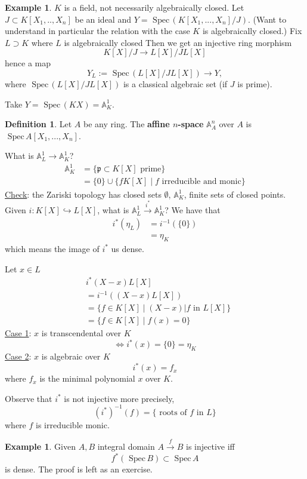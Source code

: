\documentclass[11pt]{article}
\theoremstyle{definition}
\newtheorem{dfn}[thm]{Definition}
\newtheorem{ex}[thm]{Example}
\newcommand{\spec}{\text{ Spec}\,}
\newcommand{\affn}{\mathbb A}
\newcommand{\scp}{{\mathfrak p}}
\newcommand{\lrta}{\longrightarrow}
\newcommand{\Llrta}{\Longleftrightarrow}
\newcommand{\inj}{\hookrightarrow}
\begin{document}
\begin{ex}
$K$ is a field, not necessarily algebraically closed. Let $J\subset K[X_1,..,X_n]$ be an ideal and $Y=\spec (K[X_1,...,X_n]/J)$. (Want to understand in particular the relation with the case $K$ is algebraically closed.) Fix $L \supset K$  where $L$  is algebraically closed Then we get an injective ring morphism 
$$
K[X]/J\lrta L[X]/JL[X]
$$
hence a map
$$
Y_L:=\spec(L[X]/JL[X])\lrta Y,
$$
where $\spec(L[X]/JL[X])$ is a classical algebraic set (if $J$ is prime).

Take
$Y=\spec (K{X})=\affn^1_K$.

\begin{dfn}
	Let $A$ be any ring. The \textbf{affine $n$-space} $\affn^n_A$ over $A$ is $\spec A[X_1,...,X_n]$.
\end{dfn}
	
	


What is $\affn^1_L\lrta \affn^1_K$?
$$
\begin{aligned}
\affn^1_K&=\{\scp\subset K[X]\text{ prime}\}\\
&=\{0\} \cup \{fK[X]\mid f \text{ irreducible and monic}\}
\end{aligned}
$$
\underline{Check}: the Zariski topology has  closed sets $\emptyset$, $\affn^1_K$, finite sets of closed points. Given $i: K[X]\inj L[X]$, what is 
$\affn^1_L\overset{i^*}{\lrta }\affn^1_K$? We have that
$$
\begin{aligned}
i^*(\eta_L)&=i^{-1}(\{0\})\\
&= \eta_K
\end{aligned}
$$
which means the image of $i^*$ us dense.

Let $x\in L$
$$\begin{aligned}
&i^*(X-x)L[X]\\
&=i^{-1}((X-x)L[X])\\
&=\{f\in K[X]\mid (X-x)|f\text{ in } L[X]\}\\
&=\{f\in K[X]\mid f(x)=0\}
\end{aligned}
$$
\underline{Case 1}: $x$ is transcendental over $K$ 
$$
\Llrta i^*(x)=\{0\}=\eta_K
$$
\underline{Case 2}: $x$ is algebraic over $K$
$$
i^*(x)=f_x
$$
 where $f_x$ is the minimal polynomial $x$ over $K$.

 Observe that $i^*$ is not injective more precisely,
 $$
(i^*)^{-1}(f)=\{\text{ roots of $f$ in $L$}\}
 $$
 where $f$ is irreducible monic.
\end{ex}

\begin{ex}
Given $A,B$ integral domain 
$A\overset{f}{\lrta} B$ is injective iff
$$
f^{*}(\spec B)\subset \spec A
$$ is  dense. The proof is left as an exercise.

\end{ex}
\end{document}
